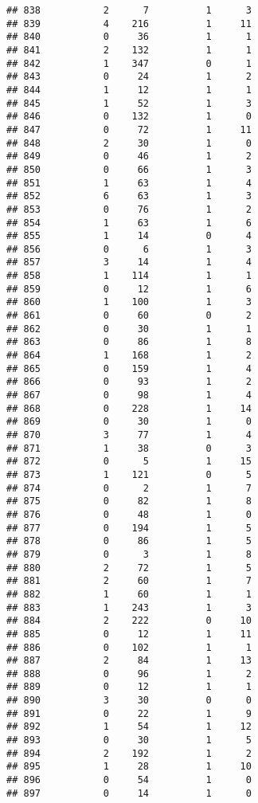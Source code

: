 \documentclass[]{article}
\begin{document}
\begin{verbatim}
## 838           2      7          1      3
## 839           4    216          1     11
## 840           0     36          1      1
## 841           2    132          1      1
## 842           1    347          0      1
## 843           0     24          1      2
## 844           1     12          1      1
## 845           1     52          1      3
## 846           0    132          1      0
## 847           0     72          1     11
## 848           2     30          1      0
## 849           0     46          1      2
## 850           0     66          1      3
## 851           1     63          1      4
## 852           6     63          1      3
## 853           0     76          1      2
## 854           1     63          1      6
## 855           1     14          0      4
## 856           0      6          1      3
## 857           3     14          1      4
## 858           1    114          1      1
## 859           0     12          1      6
## 860           1    100          1      3
## 861           0     60          0      2
## 862           0     30          1      1
## 863           0     86          1      8
## 864           1    168          1      2
## 865           0    159          1      4
## 866           0     93          1      2
## 867           0     98          1      4
## 868           0    228          1     14
## 869           0     30          1      0
## 870           3     77          1      4
## 871           1     38          0      3
## 872           0      5          1     15
## 873           1    121          0      5
## 874           0      2          1      7
## 875           0     82          1      8
## 876           0     48          1      0
## 877           0    194          1      5
## 878           0     86          1      5
## 879           0      3          1      8
## 880           2     72          1      5
## 881           2     60          1      7
## 882           1     60          1      1
## 883           1    243          1      3
## 884           2    222          0     10
## 885           0     12          1     11
## 886           0    102          1      1
## 887           2     84          1     13
## 888           0     96          1      2
## 889           0     12          1      1
## 890           3     30          0      0
## 891           0     22          1      9
## 892           1     54          1     12
## 893           0     30          1      5
## 894           2    192          1      2
## 895           1     28          1     10
## 896           0     54          1      0
## 897           0     14          1      0

\end{verbatim}
\end{document}
